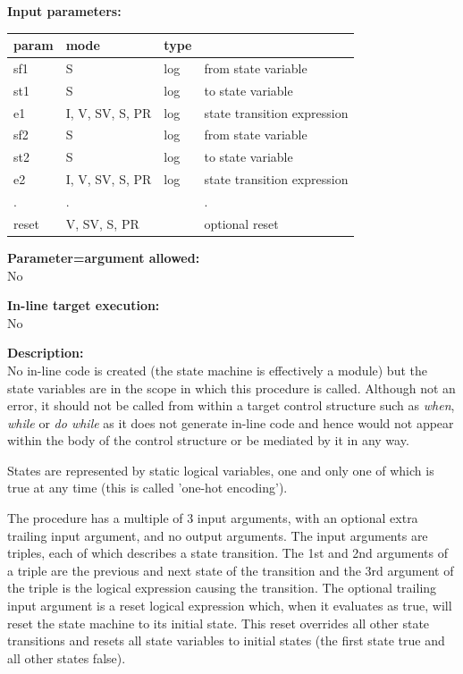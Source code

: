         {\bf Input parameters:} \\
        \begin{tabular}{| l | l | l | l |}
        \hline
        param  & mode     & type  & \\
        \hline \hline
        sf1   & S               & log & from state variable         \\ \hline
        st1   & S               & log & to state variable           \\ \hline
        e1    & I, V, SV, S, PR & log & state transition expression \\ \hline
        sf2   & S               & log & from state variable         \\ \hline
        st2   & S               & log & to state variable           \\ \hline
        e2    & I, V, SV, S, PR & log & state transition expression \\ \hline
        .     & .               &     & .                           \\ \hline
        reset & V, SV, S, PR    &     & optional reset              \\ \hline
        \end{tabular}
        
        {\bf Parameter=argument allowed:} \\
        No
        
        {\bf In-line target execution:} \\
        No
        
        {\bf Description:} \\
        No in-line code is created (the state machine is effectively a
        module) but the state variables are in the scope in which this
        procedure is called. Although not an error, it should not be called from
        within a target control structure such as {\em when}, {\em while} or
        {\em do while} as it does not generate in-line code and hence would
        not appear within the body of the control structure or be mediated by
        it in any way.

        States are represented by static logical variables, one and only one
        of which is true at any time (this is called 'one-hot encoding').

        The procedure has a multiple of 3 input arguments, with an optional
        extra trailing input argument, and no output arguments. The input
        arguments are triples, each of which describes a state transition.
        The 1st and 2nd arguments of a triple are the previous and next state
        of the transition and the 3rd argument of the triple is the logical
        expression causing the transition. The optional trailing input
        argument is a reset logical expression which, when it evaluates as
        true, will reset the state machine to its initial state. This reset
        overrides all other state transitions and resets all state variables to
        initial states (the first state true and all other states false).

